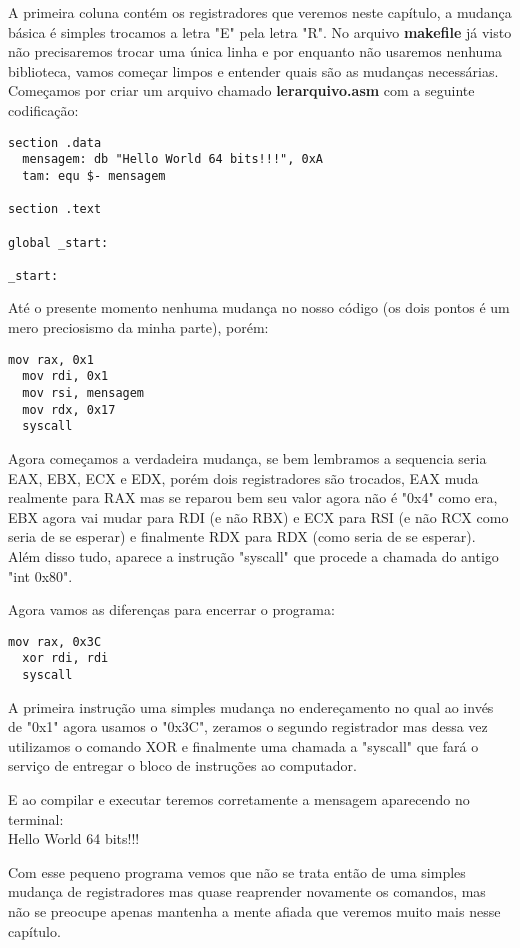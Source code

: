 A primeira coluna contém os registradores que veremos neste capítulo, a mudança básica é simples trocamos a letra "E" pela letra "R". No arquivo \textbf{makefile} já visto não precisaremos trocar uma única linha e por enquanto não usaremos nenhuma biblioteca, vamos começar limpos e entender quais são as mudanças necessárias. Começamos por criar um arquivo chamado \textbf{lerarquivo.asm} com a seguinte codificação:
\begin{lstlisting}[]
section .data
  mensagem: db "Hello World 64 bits!!!", 0xA
  tam: equ $- mensagem

section .text

global _start:

_start:
\end{lstlisting}	

Até o presente momento nenhuma mudança no nosso código (os dois pontos é um mero preciosismo da minha parte), porém:
\begin{lstlisting}[]
  mov rax, 0x1
  mov rdi, 0x1
  mov rsi, mensagem
  mov rdx, 0x17
  syscall
\end{lstlisting}

Agora começamos a verdadeira mudança, se bem lembramos a sequencia seria EAX, EBX, ECX e EDX, porém dois registradores são trocados, EAX muda realmente para RAX mas se reparou bem seu valor agora não é "0x4" como era, EBX agora vai mudar para RDI (e não RBX) e ECX para RSI (e não RCX como seria de se esperar) e finalmente RDX para RDX (como seria de se esperar). Além disso tudo, aparece a instrução "syscall" que procede a chamada do antigo "int 0x80".

Agora vamos as diferenças para encerrar o programa:
\begin{lstlisting}[]
  mov rax, 0x3C
  xor rdi, rdi
  syscall
\end{lstlisting}	

A primeira instrução uma simples mudança no endereçamento no qual ao invés de "0x1" agora usamos o "0x3C", zeramos o segundo registrador mas dessa vez utilizamos o comando XOR e finalmente uma chamada a "syscall" que fará o serviço de entregar o bloco de instruções ao computador.

E ao compilar e executar teremos corretamente a mensagem aparecendo no terminal: \\
{\ttfamily Hello World 64 bits!!!}

Com esse pequeno programa vemos que não se trata então de uma simples mudança de registradores mas quase reaprender novamente os comandos, mas não se preocupe apenas mantenha a mente afiada que veremos muito mais nesse capítulo.
